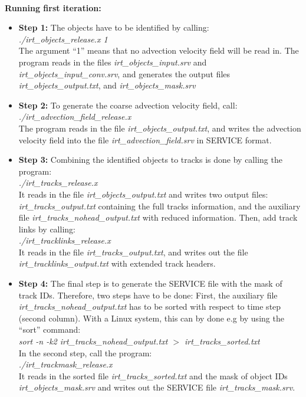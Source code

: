 \documentclass[11pt]{article}
\begin{document}
\vspace{0.5cm}\\
{\bf Running first iteration:}\\
\begin{itemize}
\item {\bf Step 1:} The objects have to be identified by calling:\\
{\it ./irt\_objects\_release.x 1}\\
The argument ``1'' means that no advection velocity field will be read in. The program reads in the files {\it irt\_objects\_input.srv} and {\it irt\_objects\_input\_conv.srv}, and generates the output files {\it irt\_objects\_output.txt}, and {\it irt\_objects\_mask.srv}
\item {\bf Step 2:} To generate the coarse advection velocity field, call:\\
{\it ./irt\_advection\_field\_release.x}\\
The program reads in the file {\it irt\_objects\_output.txt}, and writes the advection velocity field into the file {\it irt\_advection\_field.srv} in SERVICE format.
\item {\bf Step 3:} Combining the identified objects to tracks is done by calling the program:\\
{\it ./irt\_tracks\_release.x}\\
It reads in the file {\it irt\_objects\_output.txt} and writes two output files: {\it irt\_tracks\_output.txt} containing the full tracks information, and the auxiliary file {\it irt\_tracks\_nohead\_output.txt} with reduced information. Then, add track links by calling:\\
{\it ./irt\_tracklinks\_release.x}\\
It reads in the file {\it irt\_tracks\_output.txt}, and writes out the file {\it irt\_tracklinks\_output.txt} with extended track headers.
\item {\bf Step 4:} The final step is to generate the SERVICE file with the mask of track IDs. Therefore, two steps have to be done: First, the auxiliary file {\it irt\_tracks\_nohead\_output.txt} has to be sorted with respect to time step (second column). With a Linux system, this can by done e.g by using the ``sort'' command:\\
{\it sort -n -k2 irt\_tracks\_nohead\_output.txt $>$ irt\_tracks\_sorted.txt}\\
In the second step, call the program:\\
{\it ./irt\_trackmask\_release.x}\\
It reads in the sorted file {\it irt\_tracks\_sorted.txt} and the mask of object IDs {\it irt\_objects\_mask.srv} and writes out the SERVICE file {\it irt\_tracks\_mask.srv}.
\end{itemize}\vspace{0.5cm}
\end{document}
